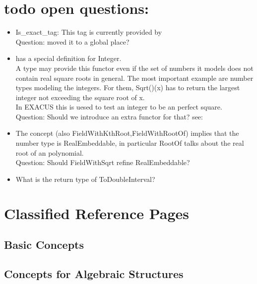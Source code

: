 


\section{todo open questions:}

\begin{itemize}
\item Is\_exact\_tag: This tag is currently provided by \\
Question: moved it to a global place? 
\item {} has a special definition for Integer. \\
        A type may provide this functor even if the set of 
        numbers it models does not contain real square roots in general. 
        The most important example are number types modeling the integers. 
        For them, Sqrt()(x) has to return the largest integer not exceeding 
        the square root of x.\\
        In EXACUS this is uesed to test an integer to be an perfect square. \\
        Question: Should we introduce an extra functor for that?
        see: 
\item The concept  (also FieldWithKthRoot,FieldWithRootOf) 
      implies that the number type is RealEmbeddable, in particular RootOf talks 
      about the real root of an polynomial.\\
      Question: Should FieldWithSqrt refine RealEmbeddable?  
\item What is the return type of ToDoubleInterval?     

\end{itemize}

\section{Classified Reference Pages}

\subsection*{Basic Concepts}

\subsection*{Concepts for Algebraic Structures}
\\
\\
\\
\\
\\
\\

